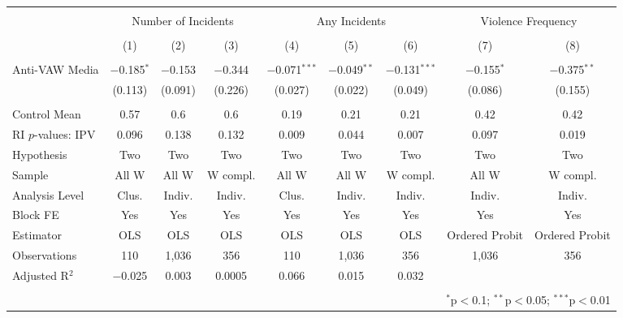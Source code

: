 
\begin{tabular}{@{\extracolsep{5pt}}lcccccccc} 
\\[-1.8ex]\hline 
\hline \\[-1.8ex] 
 & \multicolumn{3}{c}{Number of Incidents} & \multicolumn{3}{c}{Any Incidents} & \multicolumn{2}{c}{Violence Frequency} \\ 
\\[-1.8ex] & (1) & (2) & (3) & (4) & (5) & (6) & (7) & (8)\\ 
\hline \\[-1.8ex] 
 Anti-VAW Media & $-$0.185$^{*}$ & $-$0.153 & $-$0.344 & $-$0.071$^{***}$ & $-$0.049$^{**}$ & $-$0.131$^{***}$ & $-$0.155$^{*}$ & $-$0.375$^{**}$ \\ 
  & (0.113) & (0.091) & (0.226) & (0.027) & (0.022) & (0.049) & (0.086) & (0.155) \\ 
 \hline \\[-1.8ex] 
Control Mean & 0.57 & 0.6 & 0.6 & 0.19 & 0.21 & 0.21 & 0.42 & 0.42 \\ 
RI $p$-values: IPV & 0.096 & 0.138 & 0.132 & 0.009 & 0.044 & 0.007 & 0.097 & 0.019 \\ 
Hypothesis & Two & Two & Two & Two & Two & Two & Two & Two \\ 
Sample & All W & All W & W compl. & All W & All W & W compl. & All W & W compl. \\ 
Analysis Level & Clus. & Indiv. & Indiv. & Clus. & Indiv. & Indiv. & Indiv. & Indiv. \\ 
Block FE & Yes & Yes & Yes & Yes & Yes & Yes & Yes & Yes \\ 
Estimator & OLS & OLS & OLS & OLS & OLS & OLS & Ordered Probit & Ordered Probit \\ 
Observations & 110 & 1,036 & 356 & 110 & 1,036 & 356 & 1,036 & 356 \\ 
Adjusted R$^{2}$ & $-$0.025 & 0.003 & 0.0005 & 0.066 & 0.015 & 0.032 &  &  \\ 
\hline 
\hline \\[-1.8ex] 
\multicolumn{9}{r}{$^{*}$p$<$0.1; $^{**}$p$<$0.05; $^{***}$p$<$0.01} \\ 
\end{tabular} 
